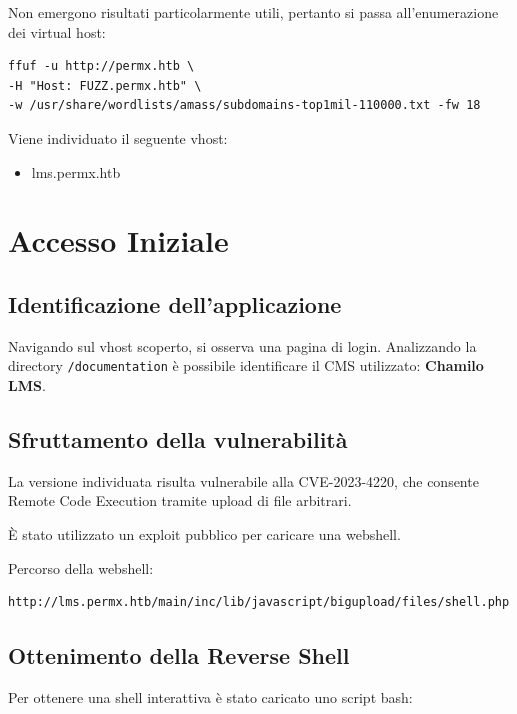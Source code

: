\documentclass[a4paper,11pt]{article}
\begin{document}
Non emergono risultati particolarmente utili, pertanto si passa all'enumerazione dei virtual host:

\begin{lstlisting}
ffuf -u http://permx.htb \
-H "Host: FUZZ.permx.htb" \
-w /usr/share/wordlists/amass/subdomains-top1mil-110000.txt -fw 18
\end{lstlisting}

Viene individuato il seguente vhost:

\begin{itemize}
    \item lms.permx.htb
\end{itemize}

\section{Accesso Iniziale}

\subsection{Identificazione dell'applicazione}

Navigando sul vhost scoperto, si osserva una pagina di login.  
Analizzando la directory \texttt{/documentation} è possibile identificare il CMS utilizzato: \textbf{Chamilo LMS}.

\subsection{Sfruttamento della vulnerabilità}

La versione individuata risulta vulnerabile alla CVE-2023-4220, che consente Remote Code Execution tramite upload di file arbitrari.

È stato utilizzato un exploit pubblico per caricare una webshell.

Percorso della webshell:

\begin{lstlisting}
http://lms.permx.htb/main/inc/lib/javascript/bigupload/files/shell.php
\end{lstlisting}

\subsection{Ottenimento della Reverse Shell}

Per ottenere una shell interattiva è stato caricato uno script bash:
\end{document}
